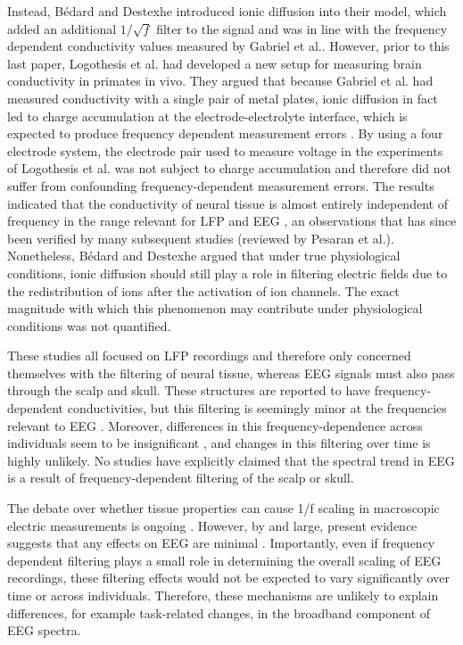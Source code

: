 Instead, Bédard and Destexhe\cite{Bedard2006a} introduced ionic diffusion into their model, which added an additional $1/\sqrt{f}$ filter to the signal and was in line with the frequency dependent conductivity values measured by Gabriel et al.\cite{Gabriel1996}. However, prior to this last paper, Logothesis et al.\cite{Logothetis2007} had developed a new setup for measuring brain conductivity in primates in vivo. They argued that because Gabriel et al. \cite{Gabriel1996} had measured conductivity with a single pair of metal plates, ionic diffusion in fact led to charge accumulation at the electrode-electrolyte interface, which is expected to produce frequency dependent measurement errors \cite{Warburg1899}. By using a four electrode system, the electrode pair used to measure voltage in the experiments of Logothesis et al.\cite{Logothetis2007} was not subject to charge accumulation and therefore did not suffer from confounding frequency-dependent measurement errors. The results indicated that the conductivity of neural tissue is almost entirely independent of frequency in the range relevant for LFP and EEG \cite{Logothetis2007}, an observations that has since been verified by many subsequent studies (reviewed by Pesaran et al.\cite{Pesaran2018}). Nonetheless, Bédard and Destexhe\cite{Bedard2006a} argued that under true physiological conditions, ionic diffusion should still play a role in filtering electric fields due to the redistribution of ions after the activation of ion channels. The exact magnitude with which this phenomenon may contribute under physiological conditions was not quantified.

These studies all focused on LFP recordings and therefore only concerned themselves with the filtering of neural tissue, whereas EEG signals must also pass through the scalp and skull. These structures are reported to have frequency-dependent conductivities, but this filtering is seemingly minor at the frequencies relevant to EEG \cite{Pfurtscheller1975, Akhtari2002, Pesaran2018}. Moreover, differences in this frequency-dependence across individuals seem to be insignificant \cite{Akhtari2002}, and changes in this filtering over time is highly unlikely. No studies have explicitly claimed that the spectral trend in EEG is a result of frequency-dependent filtering of the scalp or skull.

The debate over whether tissue properties can cause 1/f scaling in macroscopic electric measurements is ongoing \cite{Bedard2017}. However, by and large, present evidence suggests that any effects on EEG are minimal \cite{Logothetis2007, Pfurtscheller1975, Akhtari2002, Pesaran2018}. Importantly, even if frequency dependent filtering plays a small role in determining the overall scaling of EEG recordings, these filtering effects would not be expected to vary significantly over time or across individuals. Therefore, these mechanisms are unlikely to explain differences, for example task-related changes, in the broadband component of EEG spectra. 

